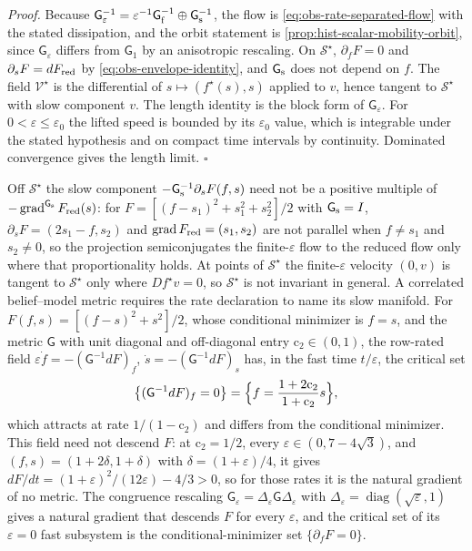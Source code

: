 \noindent\emph{Proof.}
Because $\mathsf G_\varepsilon^{-1}=\varepsilon^{-1}\mathsf G_{\rm f}^{-1}\oplus\mathsf G_{\rm s}^{-1}$,
the flow is \eqref{eq:obs-rate-separated-flow} with the stated dissipation, and the
orbit statement is \cref{prop:hist-scalar-mobility-orbit}, since
$\mathsf G_\varepsilon$ differs from $\mathsf G_1$ by an anisotropic rescaling. On
$\mathcal S^\star$, $\partial_fF=0$ and $\partial_sF=dF_{\rm red}$ by
\eqref{eq:obs-envelope-identity}, and $\mathsf G_{\rm s}$ does not depend on $f$. The
field $\mathscr V^\star$ is the differential of $s\mapsto(f^\star(s),s)$ applied to
$v$, hence tangent to $\mathcal S^\star$ with slow component $v$. The length
identity is the block form of $\mathsf G_\varepsilon$. For
$0<\varepsilon\le\varepsilon_0$ the lifted speed is bounded by its
$\varepsilon_0$ value, which is integrable under the stated hypothesis and
on compact time intervals by continuity. Dominated convergence gives the
length limit. $\square$

Off $\mathcal S^\star$ the slow component $-\mathsf G_{\rm s}^{-1}\partial_sF(f,s)$
need not be a positive multiple of
$-\operatorname{grad}^{\mathsf G_{\rm s}}F_{\rm red}(s)$: for
$F=[(f-s_1)^2+s_1^2+s_2^2]/2$ with $\mathsf G_{\rm s}=I$,
$\partial_sF=(2s_1-f,s_2)$ and $\operatorname{grad}F_{\rm red}=(s_1,s_2)$ are not
parallel when $f\ne s_1$ and $s_2\ne0$, so the projection semiconjugates the
finite-$\varepsilon$ flow to the reduced flow only where that proportionality
holds. At points of $\mathcal S^\star$ the finite-$\varepsilon$ velocity $(0,v)$ is
tangent to $\mathcal S^\star$ only where $Df^\star v=0$, so $\mathcal S^\star$ is not
invariant in general. A correlated belief--model metric requires the rate
declaration to name its slow manifold. For $F(f,s)=[(f-s)^2+s^2]/2$,
whose conditional minimizer is $f=s$, and the metric $\mathsf G$ with unit diagonal
and off-diagonal entry $\mathrm c_2\in(0,1)$, the row-rated field $\varepsilon\dot f=-(\mathsf G^{-1}dF)_f$,
$\dot s=-(\mathsf G^{-1}dF)_s$ has, in the fast time $t/\varepsilon$, the critical set
\begin{equation}
\bigl\{(\mathsf G^{-1}dF)_f=0\bigr\}=\Bigl\{f=\frac{1+2\mathrm c_2}{1+\mathrm c_2}s\Bigr\},
\label{eq:obs-correlated-slow-manifold}
\end{equation}
which attracts at rate $1/(1-\mathrm c_2)$ and differs from the conditional
minimizer. This field need not descend $F$: at $\mathrm c_2=1/2$,
every $\varepsilon\in(0,7-4\sqrt3)$, and $(f,s)=(1+2\delta,1+\delta)$ with
$\delta=(1+\varepsilon)/4$, it gives
$dF/dt=(1+\varepsilon)^2/(12\varepsilon)-4/3>0$, so for those rates it
is the natural gradient of no metric. The congruence rescaling
$\mathsf G_\varepsilon=\Delta_\varepsilon\mathsf G\Delta_\varepsilon$ with
$\Delta_\varepsilon=\operatorname{diag}(\sqrt\varepsilon,1)$ gives a natural
gradient that descends $F$ for every $\varepsilon$, and the critical set of its
$\varepsilon=0$ fast subsystem is the conditional-minimizer set
$\{\partial_fF=0\}$. 

